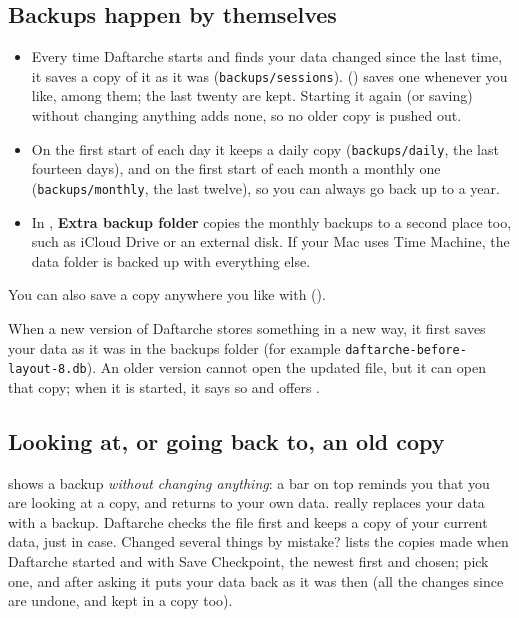 \documentclass[11pt]{article}
\begin{document}
\subsection{Backups happen by themselves}
\begin{itemize}
  \item Every time Daftarche starts and finds your data changed since the last time, it saves a
        copy of it as it was (\texttt{backups/sessions}). 
        () saves one whenever you like, among them; the last twenty are kept. Starting
        it again (or saving) without changing anything adds none, so no older copy is pushed out.
  \item On the first start of each day it keeps a daily copy (\texttt{backups/daily}, the last
        fourteen days), and on the first start of each month a monthly one (\texttt{backups/monthly},
        the last twelve), so you can always go back up to a year.
  \item In , \textbf{Extra backup folder} copies the monthly backups to a second place
        too, such as iCloud Drive or an external disk. If your Mac uses Time Machine, the data folder is
        backed up with everything else.
\end{itemize}
You can also save a copy anywhere you like with 
().

When a new version of Daftarche stores something in a new way, it first saves your data as it was
in the backups folder (for example \texttt{daftarche-before-layout-8.db}). An older version cannot open
the updated file, but it can open that copy; when it is started, it says so and offers
.

\subsection{Looking at, or going back to, an old copy}
 shows a backup \emph{without changing anything}: a bar on top reminds you
that you are looking at a copy, and  returns to your own data.
 really replaces your data with a backup. Daftarche checks the
file first and keeps a copy of your current data, just in case. Changed several things by mistake?
 lists the copies made when Daftarche started and with Save
Checkpoint, the newest first and chosen; pick one, and after asking it puts your data back as it
was then (all the changes since are undone, and kept in a copy too).
\end{document}
